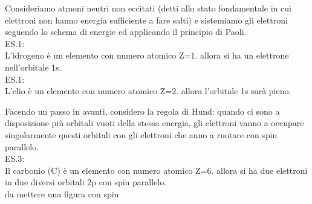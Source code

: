 \begin{exbox}
\begin{center}
\end{center}
   
%
    Consideriamo atmoni neutri non eccitati (detti allo stato fondamentale in cui elettroni non hanno energia sufficiente a fare salti) e sistemiamo gli elettroni seguendo lo schema di energie ed applicando il principio di Paoli.\\
    ES.1:\\
    L'idrogeno è un elemento con numero atomico Z=1. allora si ha un elettrone nell'orbitale 1s.\\
    ES.1:\\
    L'elio è un elemento con numero atomico Z=2. allora l'orbitale 1s sarà pieno.

    Facendo un passo in avanti, considero la regola di Hund: quando ci sono a disposizione più orbitali vuoti della stessa energia, gli elettroni vanno a occupare singolarmente questi orbitali con gli elettroni che anno a ruotare con spin parallelo.\\
    ES.3:\\
    Il carbonio (C) è un elemento con numero atomico Z=6. allora si ha due elettroni in due diversi orbitali 2p con spin parallelo.\\
    da mettere una figura con spin
\end{exbox}
%
\cleardoublepage